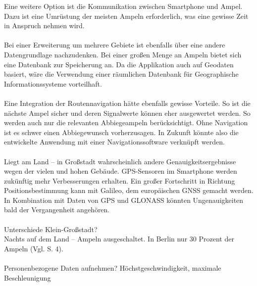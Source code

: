Eine weitere Option ist die Kommunikation zwischen \gls{Smartphone} und Ampel. Dazu ist eine Umrüstung der meisten Ampeln erforderlich, was eine gewisse Zeit in Anspruch nehmen wird. \cite{smart_lsa}\\\\
Bei einer Erweiterung um mehrere Gebiete ist ebenfalls über eine andere Datengrundlage nachzudenken. Bei einer großen Menge an Ampeln bietet sich eine Datenbank zur Speicherung an. Da die Applikation auch auf Geodaten basiert, wäre die Verwendung einer räumlichen Datenbank für Geographische Informationssysteme vorteilhaft. \\\\
Eine Integration der Routennavigation hätte ebenfalls gewisse Vorteile. So ist die nächste Ampel sicher und deren Signalwerte können eher ausgewertet werden. So werden auch nur die relevanten Abbiegeampeln berücksichtigt. Ohne Navigation ist es schwer einen Abbiegewunsch vorherzusagen. In Zukunft könnte also die entwickelte Anwendung mit einer Navigationssoftware verknüpft werden.\\\\
Liegt am Land -- in Großstadt wahrscheinlich andere Genauigkeitsergebnisse wegen der vielen und hohen Gebäude.
\gls{GPS}-Sensoren im \gls{Smartphone} werden zukünftig mehr Verbesserungen erhalten. 
Ein großer Fortschritt in Richtung Positionsbestimmung kann mit Galileo, dem europäischen \gls{GNSS} gemacht werden. In Kombination mit Daten von \gls{GPS} und \gls{GLONASS} könnten Ungenauigkeiten bald der Vergangenheit angehören. \cite{gnss}\\\\


Unterschiede Klein-Großstadt? \\
Nachts auf dem Land -- Ampeln ausgeschaltet. In Berlin nur 30 Prozent der Ampeln (Vgl. \cite{lsa_bln} S. 4).\\\\

Personenbezogene Daten aufnehmen? Höchstgeschwindigkeit, maximale Beschleunigung
